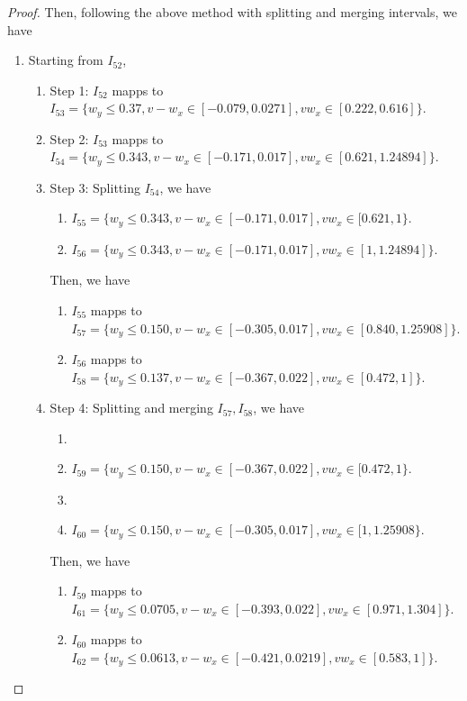\documentclass{article}
\theoremstyle{plain}
\theoremstyle{remark}
\begin{document}
\begin{proof}
Then, following the above method with splitting and merging intervals, we have
\begin{enumerate}
    \item Starting from $I_{52}$,
    \begin{enumerate}
        \item Step 1: $I_{52}$ mapps to $I_{53}=\{w_y\le 0.37, v-w_x\in[-0.079, 0.0271], vw_x \in[0.222, 0.616]\}$.
        \item Step 2: $I_{53}$ mapps to $I_{54}=\{w_y\le 0.343, v-w_x\in[-0.171, 0.017], vw_x \in[0.621, 1.24894]\}$.
        \item Step 3: Splitting $I_{54}$, we have
            \begin{enumerate}
                \item $I_{55} = \{w_y\le 0.343, v-w_x\in[-0.171, 0.017], vw_x \in[0.621, 1\}$.
                \item $I_{56} = \{w_y\le 0.343, v-w_x\in[-0.171, 0.017], vw_x \in[1, 1.24894]\}$.
            \end{enumerate}
            Then, we have
            \begin{enumerate}
                \item $I_{55}$ mapps to \\ $I_{57} = \{w_y\le 0.150, v-w_x\in[-0.305, 0.017], vw_x \in[0.840, 1.25908]\}$.
                \item $I_{56}$ mapps to \\ $I_{58} = \{w_y\le 0.137, v-w_x\in[-0.367, 0.022], vw_x \in[0.472, 1]\}$.
            \end{enumerate}
        \item Step 4: Splitting and merging $I_{57}, I_{58}$, we have
            \begin{enumerate}
                \item \item $I_{59} = \{w_y\le 0.150, v-w_x\in[-0.367, 0.022], vw_x \in[0.472, 1\}$.
                \item \item $I_{60} = \{w_y\le 0.150, v-w_x\in[-0.305, 0.017], vw_x \in[1, 1.25908\}$.
            \end{enumerate}
            Then, we have
            \begin{enumerate}
                \item $I_{59}$ mapps to \\ $I_{61} = \{w_y\le 0.0705, v-w_x\in[-0.393, 0.022], vw_x \in[0.971, 1.304]\}$.
                \item $I_{60}$ mapps to \\ $I_{62} = \{w_y\le 0.0613, v-w_x\in[-0.421, 0.0219], vw_x \in[0.583, 1]\}$.
            \end{enumerate}
    \end{enumerate}
    

\end{enumerate}
\end{proof}
\end{document}
